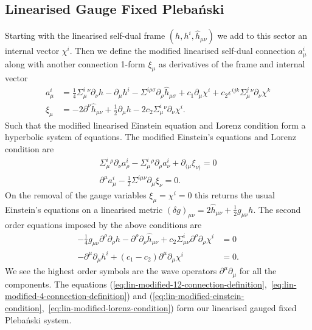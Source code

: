 \documentclass[10pt]{report}
\newcommand{\pleb}[0]{Pleba\'nski}
\theoremstyle{definition}
\begin{document}
        \subsection{Linearised Gauge Fixed \pleb{}}\label{subsec:lin-gauge-fixing-2-param-family}
        Starting with the linearised self-dual frame $(h,h^i,\hat{h}_{\mu\nu})$ we add to this sector an internal vector $\chi^i$. Then we define the modified linearised self-dual connection $a^i_\mu$ along with another connection 1-form $\xi_\mu$ as derivatives of the frame and internal vector
        \begin{align}
            a^i_\mu &= \frac{1}{4} \Sigma^i_\mu{}^\nu \partial_\nu h - \partial_\mu h^i - \Sigma^{i\rho\sigma} \partial_\rho \hat{h}_{\mu\sigma} + c_1 \partial_\mu \chi^i + c_2 \epsilon^{ijk} \Sigma^j_\mu{}^\nu \partial_\nu \chi^k \label{eq:lin-modified-12-connection-definition}\\
            \xi_\mu &= -2 \partial^\nu \hat{h}_{\mu\nu} + \frac{1}{2}\partial_\mu h - 2 c_2 \Sigma^i_\mu{}^\nu \partial_\nu \chi^i \label{eq:lin-modified-4-connection-definition}.
        \end{align}
        Such that the modified linearised Einstein equation and Lorenz condition form a hyperbolic system of equations. The modified Einstein's equations and Lorenz condition are 
        \begin{align}
            \Sigma^i_\mu{}^\rho \partial_\nu a^i_\rho - \Sigma^i_\mu{}^\rho \partial_\rho a^i_\nu + \partial_{(\mu} \xi_{\nu)} = 0 \label{eq:lin-modified-einstein-condition}\\
            \partial^\mu a^i_\mu - \frac{1}{2} \Sigma^{i\mu\nu} \partial_\mu \xi_\nu = 0.\label{eq:lin-modified-lorenz-condition}
        \end{align}
        On the removal of the gauge variables $\xi_\mu = \chi^i = 0$ this returns the usual Einstein's equations on a linearised metric $(\delta g)_{\mu\nu} = 2 \hat{h}_{\mu\nu} + \frac{1}{2} g_{\mu\nu} h$. The second order equations imposed by the above conditions are 
        \begin{align}
            - \frac{1}{4} g_{\mu\nu} \partial^\rho \partial_\rho h - \partial^\rho \partial_\rho \hat{h}_{\mu\nu} + c_2 \Sigma^i_{\mu\nu} \partial^\rho \partial_\rho \chi^i &= 0 \\
            -\partial^\mu \partial_\mu h^i + (c_1 - c_2) \partial^\mu \partial_\mu \chi^i &= 0.
        \end{align}
        We see the highest order symbols are the wave operators $\partial^\mu \partial_\mu$ for all the components. The equations (\ref{eq:lin-modified-12-connection-definition},~\ref{eq:lin-modified-4-connection-definition}) and (\ref{eq:lin-modified-einstein-condition},~\ref{eq:lin-modified-lorenz-condition}) form our linearised gauged fixed \pleb{} system.
\end{document}
